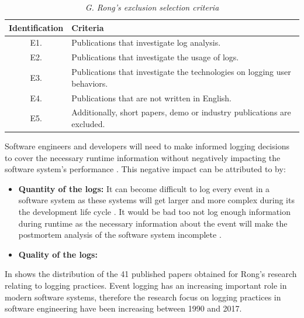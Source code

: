 \begin{table}[!htb]
	\centering
	\small
	\caption[G. Rong's exclusion selection criteria]
	{\textit{G. Rong's exclusion selection criteria \cite{Rong2018a}}}
	\label{tbl:CH1_RongExlSelectionCriteria}
	\begin{tabularx}{\textwidth}{|c|X|}
		\hline \textbf{Identification} & \textbf{Criteria} \\
		\hline E1. & Publications that investigate log analysis. \\
		\hline E2. & Publications that investigate the usage of logs. \\
		\hline E3. & Publications that investigate the technologies on logging user behaviors. \\
		\hline E4. & Publications that are not written in English. \\
		\hline E5. & Additionally, short papers, demo or industry publications are excluded. \\
		\hline
	\end{tabularx}
\end{table}
Software engineers and developers will need to make informed logging decisions to cover the necessary runtime information without negatively impacting the software system's performance \cite{Zhu2015,Zhu2019}. This negative impact can be attributed to by:

\begin{itemize}
	\item \textbf{Quantity of the logs:} It can become difficult to log every event in a software system as these systems will get larger and more complex during its the development life cycle \cite{Stojanov2017}. It would be bad too not log enough information during runtime as the necessary information about the event will make the postmortem analysis of the software system incomplete \cite{Zhu2015}.
	\item \textbf{Quality of the logs:}
\end{itemize}

In  shows the distribution of the 41 published papers obtained for Rong's research relating to logging practices. Event logging has an increasing important role in modern software systems, therefore the research focus on logging practices in software engineering have been increasing between 1990 and 2017.

